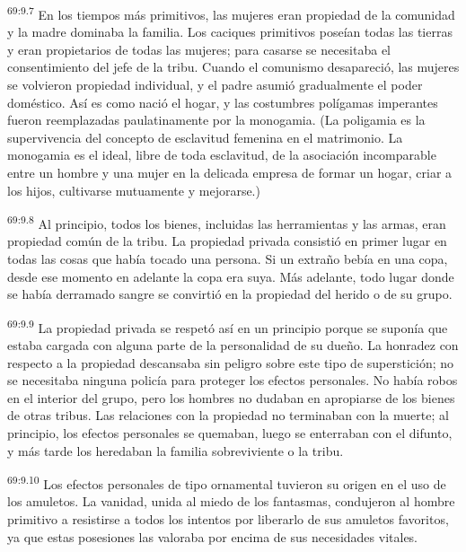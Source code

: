 \par
\textsuperscript{69:9.7} En los tiempos más primitivos, las mujeres eran propiedad de la comunidad y la madre dominaba la familia. Los caciques primitivos poseían todas las tierras y eran propietarios de todas las mujeres; para casarse se necesitaba el consentimiento del jefe de la tribu. Cuando el comunismo desapareció, las mujeres se volvieron propiedad individual, y el padre asumió gradualmente el poder doméstico. Así es como nació el hogar, y las costumbres polígamas imperantes fueron reemplazadas paulatinamente por la monogamia. (La poligamia es la supervivencia del concepto de esclavitud femenina en el matrimonio. La monogamia es el ideal, libre de toda esclavitud, de la asociación incomparable entre un hombre y una mujer en la delicada empresa de formar un hogar, criar a los hijos, cultivarse mutuamente y mejorarse.)

\par
\textsuperscript{69:9.8} Al principio, todos los bienes, incluidas las herramientas y las armas, eran propiedad común de la tribu. La propiedad privada consistió en primer lugar en todas las cosas que había tocado una persona. Si un extraño bebía en una copa, desde ese momento en adelante la copa era suya. Más adelante, todo lugar donde se había derramado sangre se convirtió en la propiedad del herido o de su grupo.

\par
\textsuperscript{69:9.9} La propiedad privada se respetó así en un principio porque se suponía que estaba cargada con alguna parte de la personalidad de su dueño. La honradez con respecto a la propiedad descansaba sin peligro sobre este tipo de superstición; no se necesitaba ninguna policía para proteger los efectos personales. No había robos en el interior del grupo, pero los hombres no dudaban en apropiarse de los bienes de otras tribus. Las relaciones con la propiedad no terminaban con la muerte; al principio, los efectos personales se quemaban, luego se enterraban con el difunto, y más tarde los heredaban la familia sobreviviente o la tribu.

\par
\textsuperscript{69:9.10} Los efectos personales de tipo ornamental tuvieron su origen en el uso de los amuletos. La vanidad, unida al miedo de los fantasmas, condujeron al hombre primitivo a resistirse a todos los intentos por liberarlo de sus amuletos favoritos, ya que estas posesiones las valoraba por encima de sus necesidades vitales.

